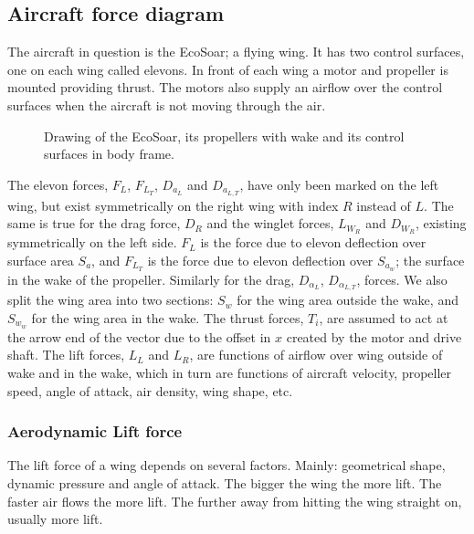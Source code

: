 
\subsection{Aircraft force diagram}
The aircraft in question is the EcoSoar; a flying wing.
It has two control surfaces, one on each wing called elevons.
In front of each wing a motor and propeller is mounted providing thrust.
The motors also supply an airflow over the control surfaces when the aircraft is not moving through the air.


\begin{figure}[h]
    \center
    \begin{tikzpicture}
    
    \end{tikzpicture}
    \caption{Drawing of the EcoSoar, its propellers with wake and its control surfaces in body frame.}
    \label{airplane}
\end{figure}

The elevon forces, $F_L$, $F_{L_T}$, $D_{a_{L}}$ and $D_{a_{L,T}}$, have only been marked on the left wing, but exist symmetrically on the right wing with index $R$ instead of $L$.
The same is true for the drag force, $D_R$ and the winglet forces, $L_{W_R}$ and $D_{W_R}$, existing symmetrically on the left side.
$F_L$ is the force due to elevon deflection over surface area $S_a$, and $F_{L_T}$ is the force due to elevon deflection over $S_{a_w}$; the surface in the wake of the propeller.
Similarly for the drag, $D_{\alpha_L}$, $D_{\alpha_{L,T}}$, forces.
We also split the wing area into two sections: $S_w$ for the wing area outside the wake, and $S_{w_w}$ for the wing area in the wake.
The thrust forces, $T_i$, are assumed to act at the arrow end of the vector due to the offset in $x$ created by the motor and drive shaft.
The lift forces, $L_L$ and $L_R$, are functions of airflow over wing outside of wake and in the wake, which in turn are functions of aircraft velocity, propeller speed, angle of attack, air density, wing shape, etc.



\subsubsection{Aerodynamic Lift force}

The lift force of a wing depends on several factors.
Mainly: geometrical shape, dynamic pressure and angle of attack.
The bigger the wing the more lift.
The faster air flows the more lift.
The further away from hitting the wing straight on, usually more lift.

